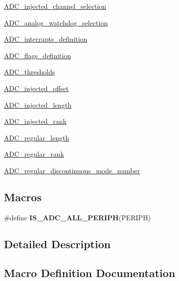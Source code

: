 \begin{DoxyCompactItemize}
\item 
\hyperlink{group___a_d_c__injected__channel__selection}{A\+D\+C\+\_\+injected\+\_\+channel\+\_\+selection}
\item 
\hyperlink{group___a_d_c__analog__watchdog__selection}{A\+D\+C\+\_\+analog\+\_\+watchdog\+\_\+selection}
\item 
\hyperlink{group___a_d_c__interrupts__definition}{A\+D\+C\+\_\+interrupts\+\_\+definition}
\item 
\hyperlink{group___a_d_c__flags__definition}{A\+D\+C\+\_\+flags\+\_\+definition}
\item 
\hyperlink{group___a_d_c__thresholds}{A\+D\+C\+\_\+thresholds}
\item 
\hyperlink{group___a_d_c__injected__offset}{A\+D\+C\+\_\+injected\+\_\+offset}
\item 
\hyperlink{group___a_d_c__injected__length}{A\+D\+C\+\_\+injected\+\_\+length}
\item 
\hyperlink{group___a_d_c__injected__rank}{A\+D\+C\+\_\+injected\+\_\+rank}
\item 
\hyperlink{group___a_d_c__regular__length}{A\+D\+C\+\_\+regular\+\_\+length}
\item 
\hyperlink{group___a_d_c__regular__rank}{A\+D\+C\+\_\+regular\+\_\+rank}
\item 
\hyperlink{group___a_d_c__regular__discontinuous__mode__number}{A\+D\+C\+\_\+regular\+\_\+discontinuous\+\_\+mode\+\_\+number}
\end{DoxyCompactItemize}
\subsection*{Macros}
\begin{DoxyCompactItemize}
\item 
\#define {\bfseries I\+S\+\_\+\+A\+D\+C\+\_\+\+A\+L\+L\+\_\+\+P\+E\+R\+I\+PH}(P\+E\+R\+I\+PH)
\end{DoxyCompactItemize}


\subsection{Detailed Description}


\subsection{Macro Definition Documentation}
